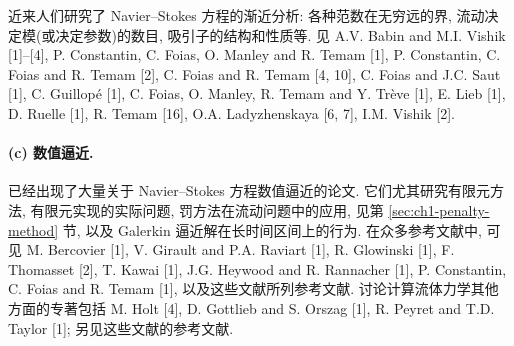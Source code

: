 \hypertarget{comments-page-403}{}
近来人们研究了 Navier--Stokes 方程的渐近分析: 各种范数在无穷远的界, 流动决定模(或决定参数)的数目, 吸引子的结构和性质等. 见 A.V. Babin and M.I. Vishik [1]--[4], P. Constantin, C. Foias, O. Manley and R. Temam [1], P. Constantin, C. Foias and R. Temam [2], C. Foias and R. Temam [4, 10], C. Foias and J.C. Saut [1], C. Guillopé [1], C. Foias, O. Manley, R. Temam and Y. Trève [1], E. Lieb [1], D. Ruelle [1], R. Temam [16], O.A. Ladyzhenskaya [6, 7], I.M. Vishik [2].

\paragraph{(c) 数值逼近.}
已经出现了大量关于 Navier--Stokes 方程数值逼近的论文. 它们尤其研究有限元方法, 有限元实现的实际问题, 罚方法在流动问题中的应用, 见第 \ref{sec:ch1-penalty-method} 节, 以及 Galerkin 逼近解在长时间区间上的行为. 在众多参考文献中, 可见 M. Bercovier [1], V. Girault and P.A. Raviart [1], R. Glowinski [1], F. Thomasset [2], T. Kawai [1], J.G. Heywood and R. Rannacher [1], P. Constantin, C. Foias and R. Temam [1], 以及这些文献所列参考文献. 讨论计算流体力学其他方面的专著包括 M. Holt [4], D. Gottlieb and S. Orszag [1], R. Peyret and T.D. Taylor [1]; 另见这些文献的参考文献.
